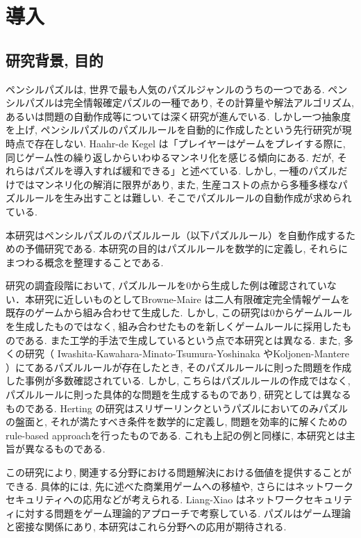 \chapter{導入}
\section{研究背景, 目的}\label{section:Introduction}
ペンシルパズルは, 世界で最も人気のパズルジャンルのうちの一つである. ペンシルパズルは完全情報確定パズルの一種であり, その計算量や解法アルゴリズム, あるいは問題の自動作成等については深く研究が進んでいる. しかし一つ抽象度を上げ, ペンシルパズルのパズルルールを自動的に作成したという先行研究が現時点で存在しない. Haahr-de Kegel \cite{Barbara2020}は「プレイヤーはゲームをプレイする際に, 同じゲーム性の繰り返しからいわゆるマンネリ化を感じる傾向にある. だが, それらはパズルを導入すれば緩和できる」と述べている. しかし, 一種のパズルだけではマンネリ化の解消に限界があり, また, 生産コストの点から多種多様なパズルルールを生み出すことは難しい. そこでパズルルールの自動作成が求められている.

本研究はペンシルパズルのパズルルール（以下パズルルール）を自動作成するための予備研究である. 本研究の目的はパズルルールを数学的に定義し, それらにまつわる概念を整理することである.

研究の調査段階において, パズルルールを0から生成した例は確認されていない．本研究に近しいものとしてBrowne-Maire \cite{Browne2010}は二人有限確定完全情報ゲームを既存のゲームから組み合わせて生成した. しかし, この研究は0からゲームルールを生成したものではなく, 組み合わせたものを新しくゲームルールに採用したものである. また工学的手法で生成しているという点で本研究とは異なる. また, 多くの研究（
Iwashita-Kawahara-Minato-Tsumura-Yoshinaka
\cite{Yoshinaka2012}やKoljonen-Mantere \cite{Mantere2007}）にてあるパズルルールが存在したとき, そのパズルルールに則った問題を作成した事例が多数確認されている. しかし, こちらはパズルルールの作成ではなく, パズルルールに則った具体的な問題を生成するものであり, 研究としては異なるものである. Herting	 \cite{Herting2004}の研究はスリザーリンクというパズルにおいてのみパズルの盤面と, それが満たすべき条件を数学的に定義し, 問題を効率的に解くためのrule-based approachを行ったものである. これも上記の例と同様に, 本研究とは主旨が異なるものである.

この研究により, 関連する分野における問題解決における価値を提供することができる. 具体的には, 先に述べた商業用ゲームへの移植や, さらにはネットワークセキュリティへの応用などが考えられる. Liang-Xiao \cite{Liang2013}はネットワークセキュリティに対する問題をゲーム理論的アプローチで考察している. パズルはゲーム理論と密接な関係にあり, 	本研究はこれら分野への応用が期待される.

